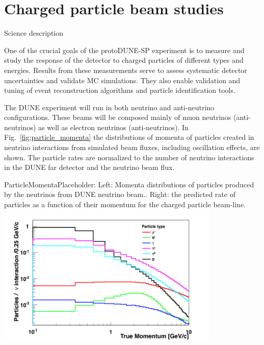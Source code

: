 
\section{Charged particle beam studies}
Science description


One of the crucial goals of the protoDUNE-SP experiment is to measure and study the response of the detector to charged
particles of different types and energies. Results from these measurements serve to
assess systematic detector uncertainties and validate MC simulations. They also enable
validation and tuning of event reconstruction algorithms and particle identification tools.

The DUNE experiment will run in both neutrino and anti-neutrino 
configurations. These beams will be composed mainly of muon neutrinos (anti-neutrinos) as well as electron neutrinos (anti-neutrinos). In Fig.~\ref{fig:particle_momenta} the distributions of momenta of particles created in neutrino interactions from simulated beam fluxes, including oscillation effects, are shown. The particle rates are normalized  to the number of neutrino interactions in the DUNE far detector and the neutrino beam flux.


\begin{cdrfigure}[Placeholder ]{ParticleMomenta}{Placeholder: Left: Momenta distributions of particles produced by the neutrinos from DUNE neutrino beam.. Right: the predicted rate of particles as a function of their momentum for the charged particle beam-line.} \label{fig:particle_momenta}
  \includegraphics[width=0.8\textwidth]{figures/True_Momenta_per_Particle_9_2_1_0_logy_logx}
\end{cdrfigure}

